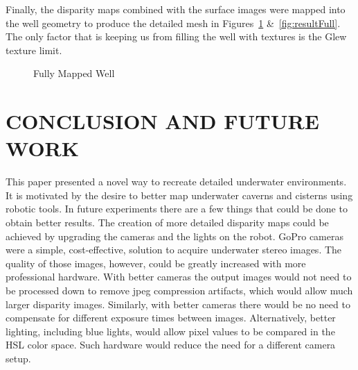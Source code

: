 \documentclass[a4paper,twoside]{article}
\begin{document}
Finally, the disparity maps combined with the surface images were mapped into the well geometry to produce the detailed mesh in Figures~\ref{fig:result4} \&~\ref{fig:resultFull}.  The only factor that is keeping us from filling the well with textures is the Glew texture limit. 

\begin{figure}[!h]
	\centering
		\caption{Fully Mapped Well}
		\label{fig:result4}
\end{figure}

\begin{figure*}[!ht]
   \vspace{-0.2cm}
   \caption{Full Displaced Well}
  \label{fig:resultFull}
 \end{figure*}


\section{\uppercase{Conclusion and Future Work}}
\label{sec:conclusion}

\noindent 
This paper presented a novel way to recreate detailed underwater environments.
It is motivated by the desire to better map underwater caverns and cisterns using robotic tools.  
In future experiments there are a few things that could be done to obtain better results.
The creation of more detailed disparity maps could be achieved by upgrading the cameras and the lights on the robot.  
GoPro cameras were a simple, cost-effective, solution to acquire underwater stereo images.  
The quality of those images, however, could be greatly increased with more professional hardware.  
With better cameras the output images would not need to be processed down to remove jpeg compression artifacts, which would allow much larger disparity images.  
Similarly, with better cameras there would be no need to compensate for different exposure times between images.
Alternatively, better lighting, including blue lights, would allow pixel values to be compared in the HSL color space.  
Such hardware would reduce the need for a different camera setup.
\end{document}
